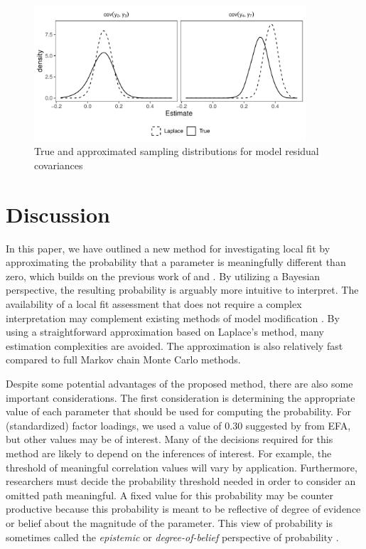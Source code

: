 \documentclass[man, noextraspace, floatsintext, 12pt]{apa7}
\begin{document}
\begin{figure}
\centering
\includegraphics[width=0.9\textwidth]{fig/sampling_dist}
\caption{True and approximated sampling distributions for model residual covariances}
\label{fig:dist}
\end{figure}


\section{Discussion}

In this paper, we have outlined a new method for investigating local fit by approximating the probability that a parameter is meaningfully different than zero, which builds on the previous work of \textcite{Lee2016} and \textcite{Shi2019}.
By utilizing a Bayesian perspective, the resulting probability is arguably more intuitive to interpret.
The availability of a local fit assessment that does not require a complex interpretation may complement existing methods of model modification \citep[e.g., ][]{Sorbom1989, Kaplan1989, Wald1943}.
By using a straightforward approximation based on Laplace's method, many estimation complexities are avoided.
The approximation is also relatively fast compared to full Markov chain Monte Carlo methods.

Despite some potential advantages of the proposed method, there are also some important considerations.
The first consideration is determining the appropriate value of each parameter that should be used for computing the probability. 
For (standardized) factor loadings, we used a value of 0.30 suggested by \textcite{Benson1998} from EFA, but other values may be of interest.
Many of the decisions required for this method are likely to depend on the inferences of interest. 
For example, the threshold of meaningful correlation values will vary by application. 
Furthermore, researchers must decide the probability threshold needed in order to consider an omitted path meaningful. 
A fixed value for this probability may be counter productive because this probability is meant to be reflective of degree of evidence or belief about the magnitude of the parameter.
This view of probability is sometimes called the \textit{epistemic} or \textit{degree-of-belief} perspective of probability \citep[][, p. 14-15]{Levy2016, deFinetti1974}.
\end{document}
